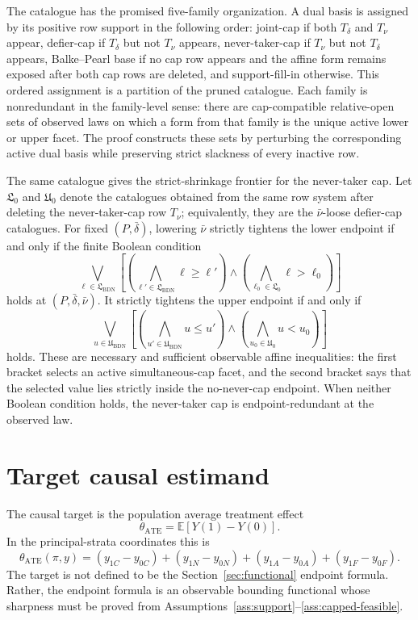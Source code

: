 \documentclass[11pt]{article}
\newcommand{\E}{\mathbb{E}}
\theoremstyle{definition}
\theoremstyle{plain}
\theoremstyle{remark}
\begin{document}
The catalogue has the promised five-family organization.  A dual basis is
assigned by its positive row support in the following order: joint-cap if both
\(T_\delta\) and \(T_\nu\) appear, defier-cap if \(T_\delta\) but not
\(T_\nu\) appears, never-taker-cap if \(T_\nu\) but not \(T_\delta\) appears,
Balke--Pearl base if no cap row appears and the affine form remains exposed
after both cap rows are deleted, and support-fill-in otherwise.  This ordered
assignment is a partition of the pruned catalogue.  Each family is
nonredundant in the family-level sense: there are cap-compatible relative-open
sets of observed laws on which a form from that family is the unique active
lower or upper facet.  The proof constructs these sets by perturbing the
corresponding active dual basis while preserving strict slackness of every
inactive row.

The same catalogue gives the strict-shrinkage frontier for the never-taker
cap.  Let
\(\mathfrak{L}_{0}\) and \(\mathfrak{U}_{0}\) denote the catalogues obtained
from the same row system after deleting the never-taker-cap row \(T_\nu\);
equivalently, they are the \(\bar\nu\)-loose defier-cap catalogues.  For fixed
\((P,\bar\delta)\), lowering \(\bar\nu\) strictly tightens the lower endpoint
if and only if the finite Boolean condition
\[
\bigvee_{\ell\in\mathfrak{L}_{\mathrm{BDN}}}
\left[
\left(\bigwedge_{\ell'\in\mathfrak{L}_{\mathrm{BDN}}}
\ell\ge \ell'\right)
\wedge
\left(\bigwedge_{\ell_0\in\mathfrak{L}_{0}}
\ell>\ell_0\right)
\right]
\]
holds at \((P,\bar\delta,\bar\nu)\).  It strictly tightens the upper endpoint
if and only if
\[
\bigvee_{u\in\mathfrak{U}_{\mathrm{BDN}}}
\left[
\left(\bigwedge_{u'\in\mathfrak{U}_{\mathrm{BDN}}}
u\le u'\right)
\wedge
\left(\bigwedge_{u_0\in\mathfrak{U}_{0}}
u<u_0\right)
\right]
\]
holds.  These are necessary and sufficient observable affine inequalities:
the first bracket selects an active simultaneous-cap facet, and the second
bracket says that the selected value lies strictly inside the no-never-cap
endpoint.  When neither Boolean condition holds, the never-taker cap is
endpoint-redundant at the observed law.

\section{Target causal estimand}
The causal target is the population average treatment effect
\[
\theta_{\mathrm{ATE}}=\E[Y(1)-Y(0)].
\]
In the principal-strata coordinates this is
\[
\theta_{\mathrm{ATE}}(\pi,y)=
(y_{1C}-y_{0C})+(y_{1N}-y_{0N})+
(y_{1A}-y_{0A})+(y_{1F}-y_{0F}).
\]
The target is not defined to be the Section~\ref{sec:functional} endpoint
formula.  Rather, the endpoint formula is an observable bounding functional
whose sharpness must be proved from Assumptions~\ref{ass:support}--\ref{ass:capped-feasible}.
\end{document}
